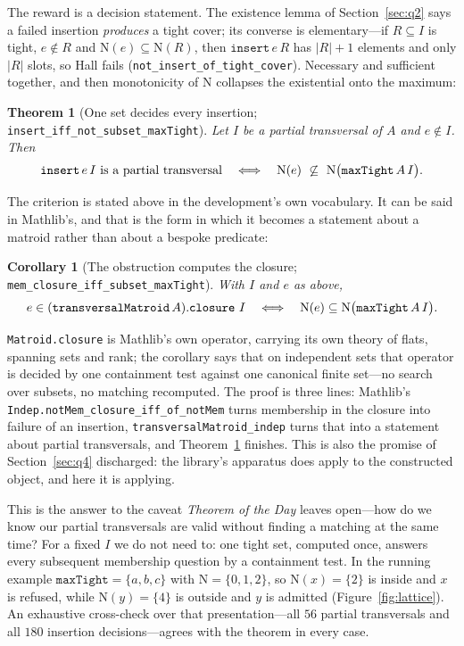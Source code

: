 \documentclass[11pt]{article}
\newtheorem{theorem}{Theorem}
\newtheorem{corollary}{Corollary}
\newcommand{\lean}[1]{\texttt{#1}}
\newcommand{\N}{\mathrm{N}}
\begin{document}
The reward is a decision statement. The existence lemma of Section~\ref{sec:q2} says a failed
insertion \emph{produces} a tight cover; its converse is elementary---if $R\subseteq I$ is tight,
$e\notin R$ and $\N(e)\subseteq\N(R)$, then $\lean{insert}\,e\,R$ has $|R|+1$ elements and only
$|R|$ slots, so Hall fails (\lean{not\_insert\_of\_tight\_cover}). Necessary and sufficient
together, and then monotonicity of $\N$ collapses the existential onto the maximum:

\begin{theorem}[One set decides every insertion; \lean{insert\_iff\_not\_subset\_maxTight}]
\label{thm:canonical}
Let $I$ be a partial transversal of $A$ and $e\notin I$. Then
\[
  \textnormal{\lean{insert}}\,e\,I \ \textnormal{is a partial transversal}
  \quad\Longleftrightarrow\quad
  \N(e)\ \not\subseteq\ \N\bigl(\textnormal{\lean{maxTight}}\,A\,I\bigr).
\]
\end{theorem}

\noindent The criterion is stated above in the development's own vocabulary. It can be said in
Mathlib's, and that is the form in which it becomes a statement about a matroid rather than about a
bespoke predicate:

\begin{corollary}[The obstruction computes the closure; \lean{mem\_closure\_iff\_subset\_maxTight}]
\label{cor:closure}
With $I$ and $e$ as above,
\[
  e\in(\textnormal{\lean{transversalMatroid}}\,A).\textnormal{\lean{closure}}\ I
  \quad\Longleftrightarrow\quad
  \N(e)\subseteq\N\bigl(\textnormal{\lean{maxTight}}\,A\,I\bigr).
\]
\end{corollary}

\noindent \lean{Matroid.closure} is Mathlib's own operator, carrying its own theory of flats,
spanning sets and rank; the corollary says that on independent sets that operator is decided by one
containment test against one canonical finite set---no search over subsets, no matching
recomputed. The proof is three lines: Mathlib's \lean{Indep.notMem\_closure\_iff\_of\_notMem} turns
membership in the closure into failure of an insertion, \lean{transversalMatroid\_indep} turns that
into a statement about partial transversals, and Theorem~\ref{thm:canonical} finishes. This is also
the promise of Section~\ref{sec:q4} discharged: the library's apparatus does apply to the
constructed object, and here it is applying.

This is the answer to the caveat \emph{Theorem of the Day} leaves open---how do we know our
partial transversals are valid without finding a matching at the same time? For a fixed $I$ we do
not need to: one tight set, computed once, answers every subsequent membership question by a
containment test. In the running example $\lean{maxTight}=\{a,b,c\}$ with $\N=\{0,1,2\}$, so
$\N(x)=\{2\}$ is inside and $x$ is refused, while $\N(y)=\{4\}$ is outside and $y$ is admitted
(Figure~\ref{fig:lattice}). An exhaustive cross-check over that presentation---all $56$ partial
transversals and all $180$ insertion decisions---agrees with the theorem in every case.
\end{document}
